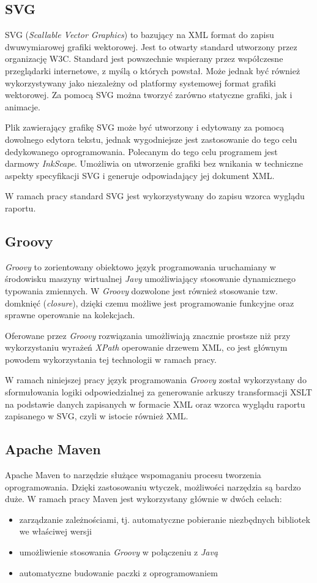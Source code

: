 \documentclass[11pt,a4paper]{article}
\begin{document}
\subsection{SVG} \label{tools:svg}
SVG (\emph{Scallable Vector Graphics}) to bazujący na XML format do zapisu dwuwymiarowej grafiki wektorowej. Jest to otwarty standard utworzony przez organizację W3C. Standard jest powszechnie wspierany przez współczesne przeglądarki internetowe, z myślą o których powstał. Może jednak być również wykorzystywany jako niezależny od platformy systemowej format grafiki wektorowej. Za pomocą SVG można tworzyć zarówno statyczne grafiki, jak i animacje.

Plik zawierający grafikę SVG może być utworzony i edytowany za pomocą dowolnego edytora tekstu, jednak wygodniejsze jest zastosowanie do tego celu dedykowanego oprogramowania. Polecanym do tego celu programem jest darmowy \emph{InkScape}. Umożliwia on utworzenie grafiki bez wnikania w techniczne aspekty specyfikacji SVG i generuje odpowiadający jej dokument XML.

W ramach pracy standard SVG jest wykorzystywany do zapisu wzorca wyglądu raportu. 

\subsection{Groovy} \label{tools:groovy}
\emph{Groovy} to zorientowany obiektowo język programowania uruchamiany w środowisku maszyny wirtualnej \emph{Javy} umożliwiający stosowanie dynamicznego typowania zmiennych. W \emph{Groovy} dozwolone jest również stosowanie tzw. domknięć (\emph{closure}), dzięki czemu możliwe jest programowanie funkcyjne oraz sprawne operowanie na kolekcjach. 

Oferowane przez \emph{Groovy} rozwiązania umożliwiają znacznie prostsze niż przy wykorzystaniu wyrażeń \emph{XPath} operowanie drzewem XML, co jest głównym powodem wykorzystania tej technologii w ramach pracy.

W ramach niniejszej pracy język programowania \emph{Groovy} został wykorzystany do sformułowania logiki odpowiedzialnej za generowanie arkuszy transformacji XSLT na podstawie danych zapisanych w formacie XML oraz wzorca wyglądu raportu zapisanego w SVG, czyli w istocie również XML. 

\subsection{Apache Maven} \label{tools:maven}
Apache Maven to narzędzie służące wspomaganiu procesu tworzenia oprogramowania. Dzięki zastosowaniu wtyczek, możliwości narzędzia są bardzo duże. W ramach pracy Maven jest wykorzystany głównie w dwóch celach: 
\begin{itemize}
\item zarządzanie zależnościami, tj. automatyczne pobieranie niezbędnych bibliotek we właściwej wersji
\item umożliwienie stosowania \emph{Groovy} w połączeniu z \emph{Javą}
\item automatyczne budowanie paczki z oprogramowaniem
\end{itemize} 
\end{document}
